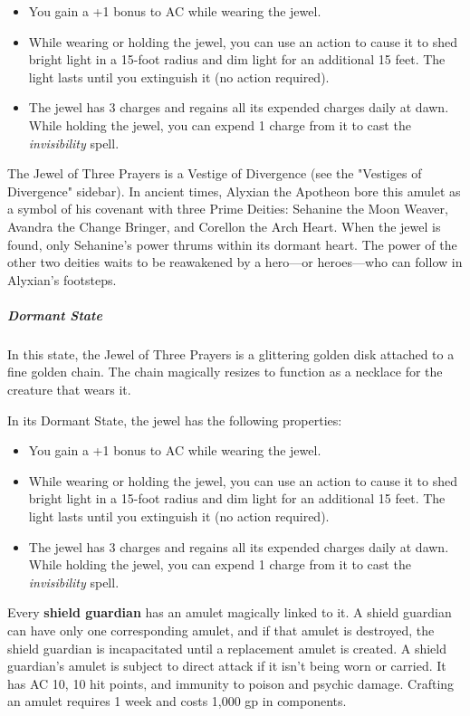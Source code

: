 \documentclass[10pt,a4paper,twoside,fancy,bg=print,twocolumn,openany,nodeprecatedcode]{dndbook}
\begin{document}
\begin{itemize}
\item You gain a +1 bonus to AC while wearing the jewel.
\item While wearing or holding the jewel, you can use an action to cause it to shed bright light in a 15-foot radius and dim light for an additional 15 feet. The light lasts until you extinguish it (no action required).
\item The jewel has 3 charges and regains all its expended charges daily at dawn. While holding the jewel, you can expend 1 charge from it to cast the \textit{invisibility} spell.
\end{itemize}

The Jewel of Three Prayers is a Vestige of Divergence (see the "Vestiges of Divergence" sidebar). In ancient times, Alyxian the Apotheon bore this amulet as a symbol of his covenant with three Prime Deities: Sehanine the Moon Weaver, Avandra the Change Bringer, and Corellon the Arch Heart. When the jewel is found, only Sehanine's power thrums within its dormant heart. The power of the other two deities waits to be reawakened by a hero—or heroes—who can follow in Alyxian's footsteps.

\subparagraph{Dormant State}
In this state, the Jewel of Three Prayers is a glittering golden disk attached to a fine golden chain. The chain magically resizes to function as a necklace for the creature that wears it.

In its Dormant State, the jewel has the following properties:


\begin{itemize}
\item You gain a +1 bonus to AC while wearing the jewel.
\item While wearing or holding the jewel, you can use an action to cause it to shed bright light in a 15-foot radius and dim light for an additional 15 feet. The light lasts until you extinguish it (no action required).
\item The jewel has 3 charges and regains all its expended charges daily at dawn. While holding the jewel, you can expend 1 charge from it to cast the \textit{invisibility} spell.
\end{itemize}

Every \textbf{shield guardian} has an amulet magically linked to it. A shield guardian can have only one corresponding amulet, and if that amulet is destroyed, the shield guardian is incapacitated until a replacement amulet is created. A shield guardian's amulet is subject to direct attack if it isn't being worn or carried. It has AC 10, 10 hit points, and immunity to poison and psychic damage. Crafting an amulet requires 1 week and costs 1,000 gp in components.
\end{document}
